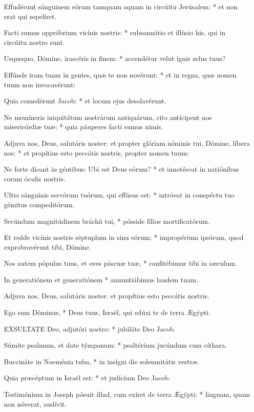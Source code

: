 Effudérunt sánguinem eórum tamquam aquam in circúitu Jerúsalem: * et non erat qui sepelíret.

Facti sumus oppróbrium vicínis nostris: * subsannátio et illúsio his, qui in circúitu nostro sunt.

Usquequo, Dómine, irascéris in finem: * accendétur velut ignis zelus tuus?

Effúnde iram tuam in gentes, quæ te non novérunt: * et in regna, quæ nomen tuum non invocavérunt:

Quia comedérunt Jacob: * et locum ejus desolavérunt.

Ne memíneris iniquitátum nostrárum antiquárum, cito antícipent nos misericórdiæ tuæ: * quia páuperes facti sumus nimis.

Adjuva nos, Deus, salutáris noster: et propter glóriam nóminis tui, Dómine, líbera nos: * et propítius esto peccátis nostris, propter nomen tuum:

Ne forte dicant in géntibus: Ubi est Deus eórum? * et innotéscat in natiónibus coram óculis nostris.

Ultio sánguinis servórum tuórum, qui effúsus est: * intróeat in conspéctu tuo gémitus compeditórum.

Secúndum magnitúdinem bráchii tui, * pósside fílios mortificatórum.

Et redde vicínis nostris séptuplum in sinu eórum: * impropérium ipsórum, quod exprobravérunt tibi, Dómine.

Nos autem pópulus tuus, et oves páscuæ tuæ, * confitébimur tibi in sæculum.

In generatiónem et generatiónem * annuntiábimus laudem tuam.

 Adjuva nos, Deus, salutáris noster: et propítius esto peccátis nostris.

 Ego sum Dóminus, * Deus tuus, Israël, qui edúxi te de terra Ægýpti.


\lettrine[lines=2]{E}{XSULTATE} Deo, adjutóri nostro: * jubiláte Deo Jacob.

Súmite psalmum, et date týmpanum: * psaltérium jucúndum cum cíthara.

Buccináte in Noeménia tuba, * in insígni die solemnitátis vestræ.

Quia præcéptum in Israël est: * et judícium Deo Jacob.

Testimónium in Joseph pósuit illud, cum exíret de terra Ægýpti: * linguam, quam non nóverat, audívit.


